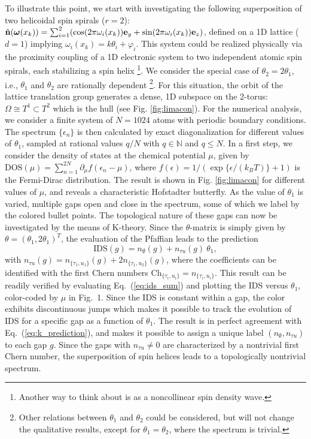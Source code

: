 \documentclass[
    aps,
    prl,
    twocolumn,
    floatfix,
    superscriptaddress
]{revtex4-2}
\begin{document}
To illustrate this point, we start with investigating the following superposition of two helicoidal spin spirals ($r=2$):
$\hat{\mathbf{n}}( \boldsymbol{\omega}(x_k ) )
=\sum_{i=1}^{2}( \cos ( 2 \pi \omega_i(x_k) )\mathbf{e}_y
+\sin ( 2 \pi \omega_i(x_k) )\mathbf{e}_z)
$,
defined on a 1D lattice ($d=1$) implying $\omega_i(x_k) = k \theta_i + \varphi_i$. 
This system could be realized physically via the proximity coupling of a 1D electronic system to two independent atomic spin spirals, each stabilizing a spin helix \footnote{Another way to think about is as a noncollinear spin density wave.}.
We consider the special case of $\theta_2 = 2 \theta_1$, i.e., $\theta_1$ and $\theta_2$ are rationally dependent \footnote{Other relations between $\theta_1$ and $\theta_2$ could be considered, but will not change the qualitative results, except for $\theta_1=\theta_2$, where the spectrum is trivial.}.
For this situation, the orbit of the lattice translation group generates a dense, 1D subspace on the 2-torus:  $\Omega \cong T^1 \subset T^2$ which is the hull (see Fig. \ref{fig:limacon}).
For the numerical analysis, we consider a finite system of $N=1024$ atoms with periodic boundary conditions. 
The spectrum $\lbrace \epsilon_n \rbrace$ is then calculated by exact diagonalization for different values of $\theta_1$, sampled at rational values $q/N$ with $q\in \mathbb{N}$ and $q \leq N$.
In a first step, we consider the density of states at the chemical potential $\mu$, given by
$\mathrm{DOS}(\mu) = \sum_{n=1}^{2N} \partial_\mu f( \epsilon_n - \mu)$, where $f(\epsilon) = 1/ ( \exp\lbrace \epsilon / (k_B T) \rbrace + 1 ) $ is the Fermi-Dirac distribution.
The result is shown in Fig. \ref{fig:limacon} for different values of $\mu$, and reveals a characteristic Hofstadter butterfly.
As the value of $\theta_1$ is varied, multiple gaps open and close in the spectrum, some of which we label by the colored bullet points.
The topological nature of these gaps can now be investigated by the means of K-theory.
Since the $\theta$-matrix is simply given by $\theta = (\theta_1, 2\theta_1)^T$, the evaluation of the Pfaffian leads to the prediction
\begin{equation}
    \mathrm{IDS}(g) = n_\emptyset(g) + n_{\tau u}(g)~\theta_1 ,
    \label{eq:k_prediction}
\end{equation}
with $n_{\tau u}(g) =  n_{ \lbrace \tau_1, u_1 \rbrace}(g) + 2 n_{ \lbrace \tau_1, u_2 \rbrace}(g) $, where the coefficients can be identified with the first Chern numbers 
$ \mathrm{Ch}_{ \lbrace \tau_i, u_i \rbrace} = n_{ \lbrace \tau_i, u_i \rbrace}$. 
This result can be readily verified by evaluating Eq.~(\ref{eq:ids_sum}) and plotting the IDS versus $\theta_1$, color-coded by $\mu$ in Fig.~1.
Since the IDS is constant within a gap, the color exhibits discontinuous jumps which makes it possible to track the evolution of IDS for a specific gap as a function of $\theta_1$.
The result is in perfect agreement with Eq.~(\ref{eq:k_prediction}), and makes it possible to assign a unique label $(n_\emptyset, n_{\tau u})$ to each gap $g$.
Since the gaps with $n_{\tau u} \neq 0$ are characterized by a nontrivial first Chern number, the superposition of spin helices leads to a topologically nontrivial spectrum.
\end{document}
